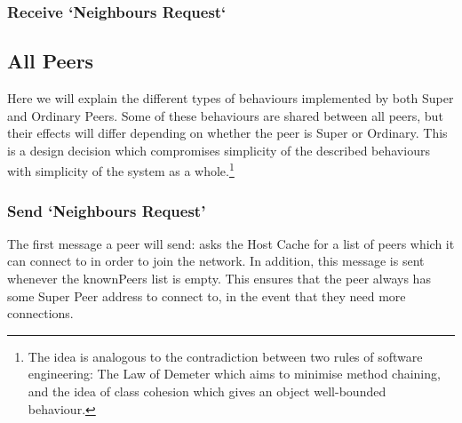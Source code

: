 \subsubsection{Receive `Neighbours Request`}

\begin{algorithm}[H]

\end{algorithm}

\subsection{All Peers}

Here we will explain the different types of behaviours implemented by both Super
and Ordinary Peers. Some of these behaviours are shared between all peers, but
their effects will differ depending on whether the peer is Super or Ordinary.
This is a design decision which compromises simplicity of the described
behaviours with simplicity of the system as a whole.\footnote{The idea is
analogous to the contradiction between two rules of software engineering: The
Law of Demeter which aims to minimise method chaining, and the idea of class
cohesion which gives an object well-bounded behaviour.}

\subsubsection{Send `Neighbours Request'}

The first message a peer will send: asks the Host Cache for a list of peers
which it can connect to in order to join the network. In addition, this message
is sent whenever the knownPeers list is empty.  This ensures that the peer
always has some Super Peer address to connect to, in the event that they need
more connections.

\begin{algorithm}[H]

\end{algorithm}

